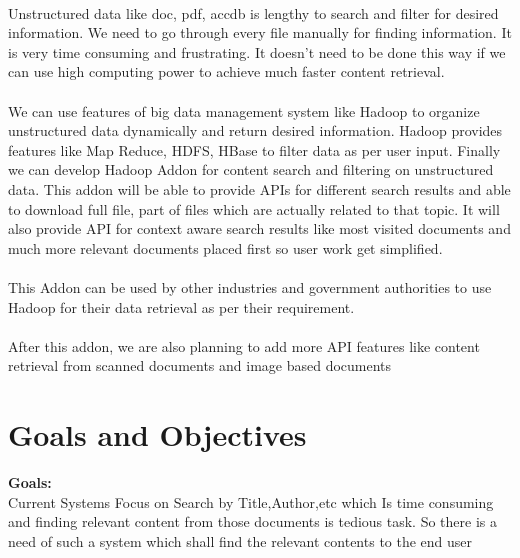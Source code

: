 \documentclass[oneside,a4paper,12pt]{article}
\begin{document}
\paragraph{} 
Unstructured data like doc, pdf, accdb is lengthy to search and filter for desired information. We need to go through every file manually for finding information. It is very time consuming and frustrating. It doesn’t need to be done this way if we can use high computing power to achieve much faster content retrieval. 

\paragraph{} 
We can use features of big data management system like Hadoop to organize unstructured data dynamically and return desired information. Hadoop provides features like Map Reduce, HDFS, HBase to filter data as per user input. Finally we can develop Hadoop Addon for content search and filtering on unstructured data. This addon will be able to provide APIs for different search results and able to download full file, part of files which are actually related to that topic. It will also provide API for context aware search results like most visited documents and much more relevant documents placed first so user work get simplified.  

\paragraph{}
This Addon can be used by other industries and government authorities to use Hadoop for their data retrieval as per their requirement. 

\paragraph{}
After this addon, we are also planning to add more API features like content retrieval from scanned documents and image based documents

\section{Goals and Objectives}
\textbf{Goals:} \\
Current Systems Focus on Search by Title,Author,etc which Is time consuming and finding relevant content from those documents is tedious task. So there is a need of such a system which shall find the relevant contents to the end user \\
\end{document}
